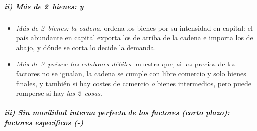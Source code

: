 \documentclass[11pt]{article}
\begin{document}
\subparagraph{ii) Más de 2~bienes:  y }

\begin{itemize}

\item \emph{Más de 2~bienes: la cadena}. \textcite{Jones1956Factor} ordena los bienes por su intensidad en capital: el país abundante en capital exporta los de arriba de la cadena e importa los de abajo, y dónde se corta lo decide la demanda.
\item \emph{Más de 2~países: los eslabones débiles}. \textcite{Deardorff1979Weak} muestra que, si los precios de los factores no se igualan, la cadena se cumple con libre comercio y solo bienes finales, y también si hay costes de comercio \emph{o} bienes intermedios, pero puede romperse si hay \emph{las 2~cosas}.
\end{itemize}

\subparagraph{iii) Sin movilidad interna perfecta de los factores (corto plazo): factores específicos (-)}\label{sec:factores-especificos}
\end{document}
